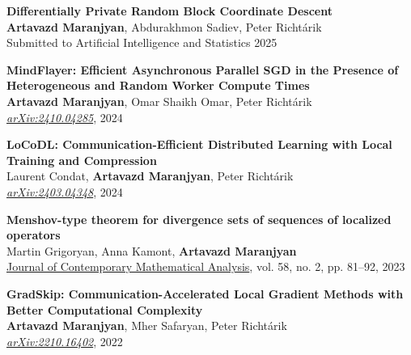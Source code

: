 \documentclass[11pt,a4paper,sans]{moderncv}        %
\begin{document}
\begin{etaremune}

\item \textbf{Differentially Private Random Block Coordinate Descent}\\
\textbf{Artavazd Maranjyan}, Abdurakhmon Sadiev, Peter Richtárik\\
Submitted to Artificial Intelligence and Statistics 2025
  
\vspace{2mm}

\item \textbf{MindFlayer: Efficient Asynchronous Parallel SGD in the Presence of Heterogeneous and Random Worker Compute Times}\\
\textbf{Artavazd Maranjyan}, Omar Shaikh Omar, Peter Richtárik\\
\textcolor{accent}{\href{https://arxiv.org/abs/2410.04285}{\textit{arXiv:2410.04285}}}, 2024
  
\vspace{2mm}

\item \textbf{LoCoDL: Communication-Efficient Distributed Learning with Local Training and Compression}\\
Laurent Condat, \textbf{Artavazd Maranjyan}, Peter Richtárik\\
\textcolor{accent}{\href{https://arxiv.org/abs/2403.04348}{\textit{arXiv:2403.04348}}}, 2024

\vspace{2mm}

\item \textbf{Menshov-type theorem for divergence sets of sequences of localized operators}\\
Martin Grigoryan, Anna Kamont, \textbf{Artavazd Maranjyan}\\
\href{https://doi.org/10.3103/S106836232302005X}{Journal of Contemporary Mathematical Analysis}, vol. 58, no. 2, pp. 81–92, 2023

\vspace{2mm}

\item \textbf{GradSkip: Communication-Accelerated Local Gradient Methods with Better Computational Complexity}\\
\textbf{Artavazd Maranjyan}, Mher Safaryan, Peter Richtárik\\
\textcolor{accent}{\href{https://arxiv.org/abs/2210.16402}{\textit{arXiv:2210.16402}}}, 2022

\vspace{2mm}


\end{etaremune}
\end{document}
